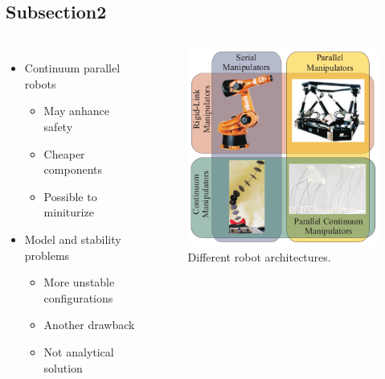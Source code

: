 \documentclass[compress]{thesisbeamer}
\begin{document}
        \subsection{Subsection2}
        \begin{frame}
			\begin{columns}
			\begin{itemize}%
  				\item Continuum parallel robots 
  				\begin{itemize}%
   					\item May anhance safety
   					\item Cheaper components 
   					\item Possible to miniturize
  				\end{itemize}
  				\item Model and stability problems
  				\begin{itemize}%
   					\item More unstable configurations
   					\item Another drawback
   					\item Not analytical solution
  				\end{itemize}
 			\end{itemize}
			\vspace{2cm}
			\begin{figure}[h]
				\centering
				\includegraphics[width=\textwidth]{images/serial_parall_robots}
				\caption{Different robot architectures.}
			\end{figure}
			\end{columns}
		\end{frame}
		
\end{document}
